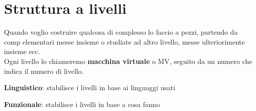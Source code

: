 \documentclass[10pt]{article}
\begin{document}
\section{Struttura a livelli}
Quando voglio costruire qualcosa di complesso lo faccio a pezzi, partendo da comp elementari messe insieme o studiate ad altro livello, messe ulteriorimente insieme ecc.\\
Ogni livello lo chiameremo \textbf{macchina virtuale} o MV, seguito da un numero che indica il numero di livello.\\
\begin{list}{-}{Due approcci fondamentali:}
\item \textbf{Linguistico}: stabilisce i livelli in base ai linguaggi usati
\item \textbf{Funzionale}: stabilisce i livelli in base a cosa fanno
\end{list}
\end{document}
